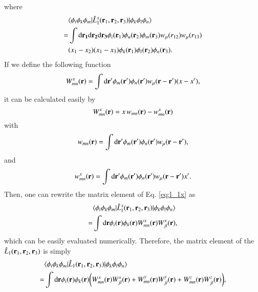 \documentclass[aip,jcp,reprint,noshowkeys,superscriptaddress]{revtex4-1}
\newcommand{\matelem}[3]{\langle #1 | #2 | #3 \rangle}
\newcommand{\bri}[1]{{\bf r}_{#1}}
\newcommand{\dr}[1]{\text{d}{\bf r_{#1}}}
\begin{document}
where 
\begin{equation}
 \begin{aligned}
 \label{eq:l_1x}
& \matelem{\phi_i \phi_k \phi_m}{\hat{L}_1^x(\bri{1},\bri{2},\bri{3})}{\phi_k \phi_l \phi_n} \\  
 = & \int \dr{1} \dr{2} \dr{3} \phi_i(\bri{1}) \phi_u(\bri{2}) \phi_m(\bri{3}) w_{\mu}(r_{12}) w_{\mu}(r_{13}) \\ 
 &(x_1 - x_2) (x_1 - x_3) \phi_k(\bri{1}) \phi_l(\bri{2}) \phi_n(\bri{3}).
 \end{aligned}
\end{equation}
If we define the following function 
\begin{equation}
 W_{mn}^x({\bf r})  = \int \text{d}{\bf r'} \phi_m({\bf r}') \phi_n({\bf r}') w_{\mu}({\bf r} - {\bf r'}) (x - x'),  
\end{equation}
it can be calculated easily by
\begin{equation}
 W_{mn}^x({\bf r})  = x \, w_{mn}({\bf r}) - w_{mn}^x({\bf r})
\end{equation}
with 
\begin{equation}
 w_{mn}({\bf r}) = \int \text{d}{\bf r'} \phi_m({\bf r}') \phi_n({\bf r}') w_{\mu}({\bf r} - {\bf r'}), 
\end{equation}
and 
\begin{equation}
  w_{mn}^x({\bf r}) = \int \text{d}{\bf r'} \phi_m({\bf r}') \phi_n({\bf r}') w_{\mu}({\bf r} - {\bf r'})  x'.
\end{equation}
Then, one can rewrite the matrix element of Eq. \eqref{eq:l_1x} as
\begin{equation}
 \begin{aligned}
 \label{eq:l_1x_2}
& \matelem{\phi_i \phi_k \phi_m}{\hat{L}_1^x(\bri{1},\bri{2},\bri{3})}{\phi_k \phi_l \phi_n} \\  
 = & \int \text{d}{\bf r} \phi_i({\bf r})  \phi_k({\bf r}) W_{mn}^x({\bf r}) W_{jl}^x({\bf r}),
 \end{aligned}
\end{equation}
which can be easily evaluated numerically. 
Therefore, the matrix element of the $\hat{L}_1(\bri{1},\bri{2},\bri{3})$ is simply 
\begin{equation}
 \begin{aligned}
 & \matelem{\phi_i \phi_k \phi_m}{\hat{L}_1(\bri{1},\bri{2},\bri{3})}{\phi_k \phi_l \phi_n} \\
 = & \int \text{d}{\bf r} \phi_i({\bf r})  \phi_k({\bf r}) \bigg( W_{mn}^x({\bf r}) W_{jl}^x({\bf r}) + W_{mn}^y({\bf r}) W_{jl}^y({\bf r}) + W_{mn}^z({\bf r}) W_{jl}^z({\bf r})\bigg),
 \end{aligned}
\end{equation}
\end{document}
